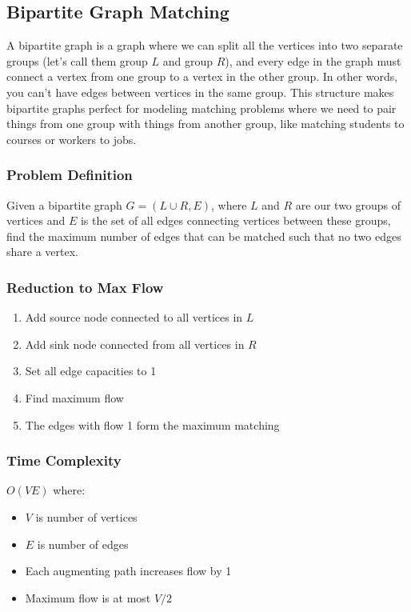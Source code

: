 \documentclass[11pt,a4paper]{article}
\begin{document}
\begin{multicols}{2}
\subsection{Bipartite Graph Matching}
A bipartite graph is a graph where we can split all the vertices into two separate groups (let's call them group $L$ and group $R$), and every edge in the graph must connect a vertex from one group to a vertex in the other group. In other words, you can't have edges between vertices in the same group. This structure makes bipartite graphs perfect for modeling matching problems where we need to pair things from one group with things from another group, like matching students to courses or workers to jobs.

\subsubsection{Problem Definition}
Given a bipartite graph $G = (L \cup R, E)$, where $L$ and $R$ are our two groups of vertices and $E$ is the set of all edges connecting vertices between these groups, find the maximum number of edges that can be matched such that no two edges share a vertex.

\subsubsection{Reduction to Max Flow}
\begin{enumerate}
    \item Add source node connected to all vertices in $L$
    \item Add sink node connected from all vertices in $R$
    \item Set all edge capacities to 1
    \item Find maximum flow
    \item The edges with flow 1 form the maximum matching
\end{enumerate}

\subsubsection{Time Complexity}
$O(VE)$ where:
\begin{itemize}
    \item $V$ is number of vertices
    \item $E$ is number of edges
    \item Each augmenting path increases flow by 1
    \item Maximum flow is at most $V/2$
\end{itemize}


\end{multicols}
\end{document}
